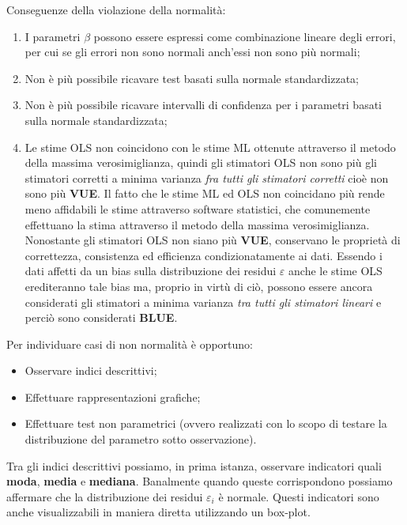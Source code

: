 \documentclass[a4page, 11pt]{article} %
\begin{document}
Conseguenze della violazione della normalità:
\begin{enumerate}[noitemsep]
\item I parametri $\beta$ possono essere espressi come combinazione lineare degli errori, per cui se gli errori non sono normali anch’essi non sono più normali;
\item Non è più possibile ricavare test basati sulla normale standardizzata;
\item Non è più possibile ricavare intervalli di confidenza per i parametri basati sulla normale standardizzata;
\item Le stime OLS non coincidono con le stime ML ottenute attraverso il metodo della massima verosimiglianza, quindi gli stimatori OLS non sono più gli stimatori corretti a minima varianza \textit{fra tutti gli stimatori corretti} cioè non sono più \textbf{VUE}. Il fatto che le stime ML ed OLS non coincidano più rende meno affidabili le stime attraverso software statistici, che comunemente effettuano la stima attraverso il metodo della massima verosimiglianza. Nonostante gli stimatori OLS non siano più \textbf{VUE}, conservano le proprietà di correttezza, consistenza ed efficienza condizionatamente ai dati. Essendo i dati affetti da un bias sulla distribuzione dei residui $\varepsilon$ anche le stime OLS erediteranno tale bias ma, proprio in virtù di ciò, possono essere ancora considerati gli stimatori a minima varianza \textit{tra tutti gli stimatori lineari} e perciò sono considerati \textbf{BLUE}.
\end{enumerate}
Per individuare casi di non normalità è opportuno:
\begin{itemize}[noitemsep]
\item Osservare indici descrittivi;
\item Effettuare rappresentazioni grafiche;
\item Effettuare test non parametrici (ovvero realizzati con lo scopo di testare la distribuzione del parametro sotto osservazione).
\end{itemize}
Tra gli indici descrittivi possiamo, in prima istanza, osservare indicatori quali \textbf{moda}, \textbf{media} e \textbf{mediana}. Banalmente quando queste corrispondono possiamo affermare che la distribuzione dei residui $\varepsilon_i$ è normale. Questi indicatori sono anche visualizzabili in maniera diretta utilizzando un box-plot.
\end{document}
